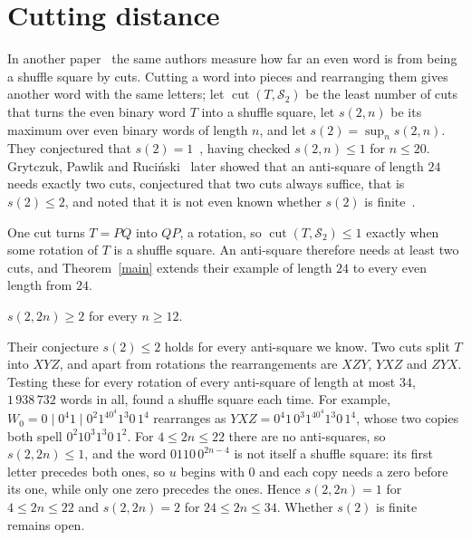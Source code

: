 \documentclass[12pt]{article}
\newcommand{\zz}[1]{0^{#1}}
\begin{document}
\section{Cutting distance}\label{sec:cut}

In another paper~\cite{GPP2} the same authors measure how far an even word is from being a shuffle square by
cuts. Cutting a word into pieces and rearranging them gives another word with the same letters; let
$\operatorname{cut}(T, \mathcal{S}_2)$ be the least number of cuts that turns the even binary word $T$ into a
shuffle square, let $s(2, n)$ be its maximum over even binary words of length $n$, and let $s(2) = \sup_n s(2,
n)$. They conjectured that $s(2) = 1$~\cite[Conjecture 4]{GPP2}, having checked $s(2, n) \le 1$ for $n \le 20$.
Grytczuk, Pawlik and Ruci\'nski~\cite{GPR} later showed that an anti-square of length $24$ needs exactly two cuts, conjectured that
two cuts always suffice, that is $s(2) \le 2$, and noted that it is not even known whether $s(2)$ is
finite~\cite[Section 6.3]{GPR}.

One cut turns $T = PQ$ into $QP$, a rotation, so $\operatorname{cut}(T, \mathcal{S}_2) \le 1$ exactly when
some rotation of $T$ is a shuffle square. An anti-square therefore needs at least two cuts, and
Theorem~\ref{main} extends their example of length $24$ to every even length from $24$.

\begin{corollary}\label{cor:cut}
$s(2, 2n) \ge 2$ for every $n \ge 12$.
\end{corollary}

Their conjecture $s(2) \le 2$ holds for every anti-square we know. Two cuts split $T$ into $XYZ$, and apart
from rotations the rearrangements are $XZY$, $YXZ$ and $ZYX$. Testing these for every rotation of every
anti-square of length at most $34$, $1\,938\,732$ words in all, found a shuffle square each time. For
example, $W_0 = 0 \mid \zz{4}1 \mid \zz{2}1^4\zz{4}1^3 0\, 1^4$ rearranges as
$YXZ = \zz{4}1\,\zz{3}1^4\zz{4}1^3 0\, 1^4$, whose two copies both spell $\zz{2}1\zz{3}1^3 0\, 1^2$. For
$4 \le 2n \le 22$ there are no anti-squares, so $s(2, 2n) \le 1$, and the word $0110\,\zz{2n-4}$ is not
itself a shuffle square: its first letter precedes both ones, so $u$ begins with $0$ and each copy needs a
zero before its one, while only one zero precedes the ones. Hence $s(2, 2n) = 1$ for $4 \le 2n \le 22$ and
$s(2, 2n) = 2$ for $24 \le 2n \le 34$. Whether $s(2)$ is finite remains open.
\end{document}
